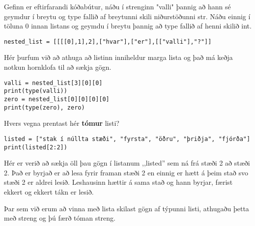 \begin{exercise}\label{lst4}
	Gefinn er eftirfarandi kóðabútur, náðu í strenginn "valli" þannig að hann sé geymdur í breytu og type fallið af breytunni skili niðurstöðunni str.
	Náðu einnig í töluna 0 innan listans og geymdu í breytu þannig að type fallið af henni skilið int. 
\begin{lstlisting}
nested_list = [[[[0],1],2],["hvar"],["er"],[["valli"],"?"]]\end{lstlisting}
\end{exercise}
\begin{Answer}[ref={lst4}]
Hér þurfum við að athuga að listinn inniheldur marga lista og það má keðja notkun hornklofa til að sækja gögn.
	\begin{lstlisting}
valli = nested_list[3][0][0]
print(type(valli))
zero = nested_list[0][0][0][0]
print(type(zero), zero)\end{lstlisting}
\end{Answer}

\begin{exercise}\label{lst5}
Hvers vegna prentast hér \textbf{tómur} listi? 
\begin{lstlisting}
listed = ["stak í núllta stæði", "fyrsta", "öðru", "þriðja", "fjórða"]
print(listed[2:2])\end{lstlisting}
\end{exercise}
\begin{Answer}[ref={lst5}]
Hér er verið að sækja öll þau gögn í listanum ,,listed'' sem ná frá stæði 2 að stæði 2.
Það er byrjað er að lesa fyrir framan stæði 2 en einnig er hætt á þeim stað svo stæði 2 er aldrei lesið.
Leshausinn hættir á sama stað og hann byrjar, færist ekkert og ekkert tákn er lesið.

Þar sem við erum að vinna með lista skilast gögn af týpunni listi, athugaðu þetta með streng og þú færð tóman streng.
\end{Answer}

